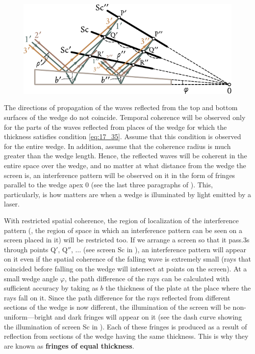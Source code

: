 \begin{figure}[!htb]
	\begin{center}
		\includegraphics[scale=1]{figures/ch_17/fig_17_13.pdf}
		\caption[]{}
		\label{fig:17_13}
	\end{center}
	\vspace{-0.8cm}
\end{figure}

The directions of propagation of the waves reflected from the top and bottom surfaces of the wedge do not coincide.
Temporal coherence will be observed only for the parts of the waves reflected from places of the wedge for which the thickness satisfies condition \eqref{eq:17_35}.
Assume that this condition is observed for the entire wedge.
In addition, assume that the coherence radius is much greater than the wedge length.
Hence, the reflected waves will be coherent in the entire space over the wedge, and no matter at what distance from the wedge the screen is, an interference pattern will be observed on it in the form of fringes parallel to the wedge apex $0$ (see the last three paragraphs of ).
This, particularly, is how matters are when a wedge is illuminated by light emitted by a laser.

With restricted spatial coherence, the region of localization of the interference pattern (\ie, the region of space in which an interference pattern can be seen on a screen placed in it) will be restricted too.
If we arrange a screen so that it pass.3s through points Q$'$, Q$''$, $\ldots$ (see screen Sc in ), an interference pattern will appear on it even if the spatial coherence of the falling wave is extremely small (rays that coincided before falling on the wedge will intersect at points on the screen).
At a small wedge angle $\varphi$, the path difference of the rays can be calculated with sufficient accuracy by  taking as $b$ the thickness of the plate at the place where the rays fall on it.
Since the path difference for the rays reflected from different sections of the wedge is now different, the illumination of the screen will be non-uniform---bright and dark fringes will appear on it (see the dash curve showing the illumination of screen Sc in ).
Each of these fringes is produced as a result of reflection from sections of the wedge having the same thickness.
This is why they are known as \textbf{fringes of equal thickness}.

